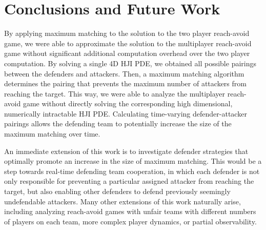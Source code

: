 \section{Conclusions and Future Work} \label{sec:conc}
By applying maximum matching to the solution to the two player reach-avoid game, we were able to approximate the solution to the multiplayer reach-avoid game without significant additional computation overhead over the two player computation. By solving a single 4D HJI PDE, we obtained all possible pairings between the defenders and attackers. Then, a maximum matching algorithm determines the pairing that prevents the maximum number of attackers from reaching the target. This way, we were able to analyze the multiplayer reach-avoid game without directly solving the corresponding high dimensional, numerically intractable HJI PDE. Calculating time-varying defender-attacker pairings allows the defending team to potentially increase the size of the maximum matching over time.

An immediate extension of this work is to investigate defender strategies that optimally promote an increase in the size of maximum matching. This would be a step towards real-time defending team cooperation, in which each defender is not only responsible for preventing a particular assigned attacker from reaching the target, but also enabling other defenders to defend previously seemingly undefendable attackers. Many other extensions of this work naturally arise, including analyzing reach-avoid games with unfair teams with different numbers of players on each team, more complex player dynamics, or partial observability. 
